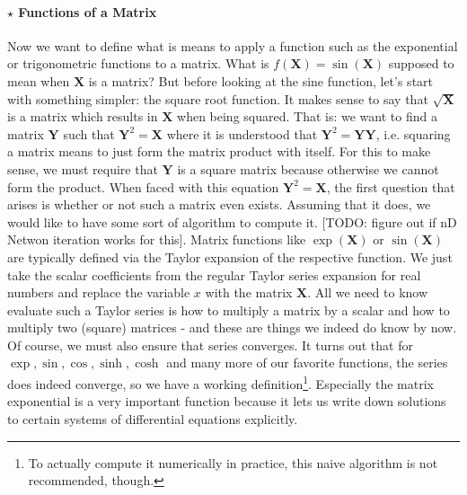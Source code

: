 \paragraph{$\star$ Functions of a Matrix}
Now we want to define what is means to apply a function such as the exponential or trigonometric functions to a matrix. What is $f(\mathbf{X}) = \sin(\mathbf{X})$ supposed to mean when $\mathbf{X}$ is a matrix? But before looking at the sine function, let's start with something simpler: the square root function. It makes sense to say that $\sqrt{\mathbf{X}}$ is a matrix which results in $\mathbf{X}$ when being squared. That is: we want to find a matrix $\mathbf{Y}$ such that $\mathbf{Y}^2 = \mathbf{X}$ where it is understood that $\mathbf{Y}^2 = \mathbf{Y Y}$, i.e. squaring a matrix means to just form the matrix product with itself. For this to make sense, we must require that $\mathbf{Y}$ is a square matrix because otherwise we cannot form the product. When faced with this equation $\mathbf{Y}^2 = \mathbf{X}$, the first question that arises is whether or not such a matrix even exists. Assuming that it does, we would like to have some sort of algorithm to compute it. [TODO: figure out if nD Netwon iteration works for this]. Matrix functions like $\exp(\mathbf{X})$ or $\sin(\mathbf{X})$ are typically defined via the Taylor expansion of the respective function. We just take the scalar coefficients from the regular Taylor series expansion for real numbers and replace the variable $x$ with the matrix  $\mathbf{X}$. All we need to know evaluate such a Taylor series is how to multiply a matrix by a scalar and how to multiply two (square) matrices - and these are things we indeed do know by now. Of course, we must also ensure that series converges. It turns out that for $\exp, \sin, \cos, \sinh, \cosh$ and many more of our favorite functions, the series does indeed converge, so we have a working definition\footnote{To actually compute it numerically in practice, this naive algorithm is not recommended, though.}. Especially the matrix exponential is a very important function because it lets us write down solutions to certain systems of differential equations explicitly.






